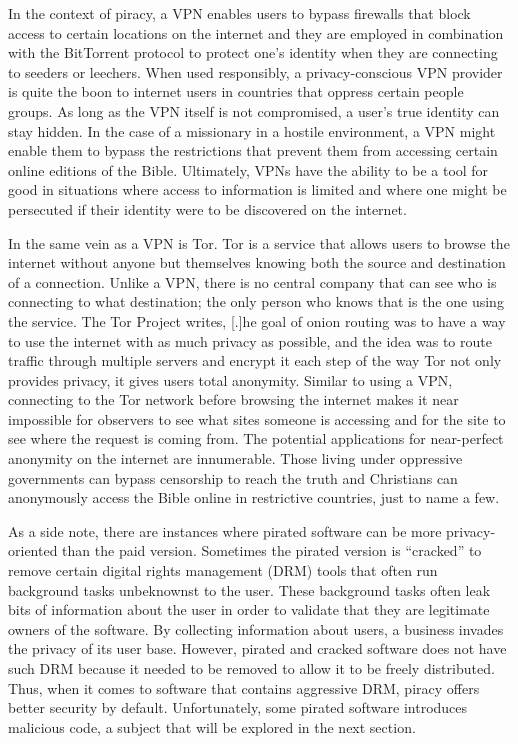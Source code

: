 \documentclass[onecolumn, 12pt]{article}
\begin{document}
In the context of piracy, a VPN enables users to bypass firewalls that block access to
certain locations on the internet and they are employed in combination with the BitTorrent
protocol to protect one's identity when they are connecting to seeders or leechers. When
used responsibly, a privacy-conscious VPN provider is quite the boon to internet users in
countries that oppress certain people groups. As long as the VPN itself is not
compromised, a user's true identity can stay hidden. In the case of a missionary in a
hostile environment, a VPN might enable them to bypass the restrictions that prevent them
from accessing certain online editions of the Bible. Ultimately, VPNs have the ability to
be a tool for good in situations where access to information is limited and where one
might be persecuted if their identity were to be discovered on the internet.

In the same vein as a VPN is Tor. Tor is a service that allows users to browse the
internet without anyone but themselves knowing both the source and destination of a
connection. Unlike a VPN, there is no central company that can see who is connecting to
what destination; the only person who knows that is the one using the service. The Tor
Project writes, [.]{he goal of onion routing was to have
a way to use the internet with as much privacy as possible, and the idea was to route
traffic through multiple servers and encrypt it each step of the way} Tor not only
provides privacy, it gives users total anonymity. Similar to using a VPN, connecting to
the Tor network before browsing the internet makes it near impossible for observers to see
what sites someone is accessing and for the site to see where the request is coming from.
The potential applications for near-perfect anonymity on the internet are innumerable.
Those living under oppressive governments can bypass censorship to reach the truth and
Christians can anonymously access the Bible online in restrictive countries, just to name
a few.

As a side note, there are instances where pirated software can be more privacy-oriented
than the paid version. Sometimes the pirated version is ``cracked'' to remove certain
digital rights management (DRM) tools that often run background tasks unbeknownst to the
user. These background tasks often leak bits of information about the user in order to
validate that they are legitimate owners of the software. By collecting information about
users, a business invades the privacy of its user base. However, pirated and cracked
software does not have such DRM because it needed to be removed to allow it to be freely
distributed. Thus, when it comes to software that contains aggressive DRM, piracy offers
better security by default. Unfortunately, some pirated software introduces malicious
code, a subject that will be explored in the next section.
\end{document}
